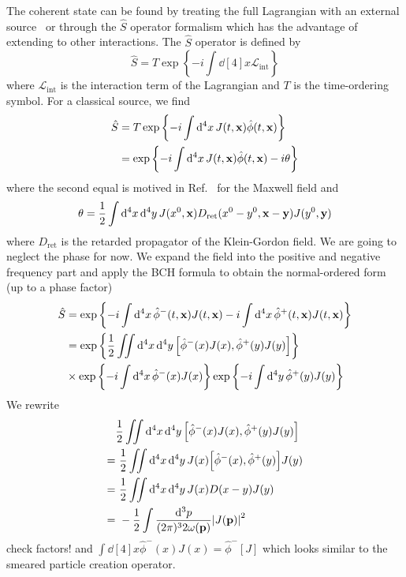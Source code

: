 The coherent state can be found by treating the full Lagrangian with an external source~\cite{Peskin1995} or through the $\hat{S}$ operator formalism which has the advantage of extending to other interactions.
The $\hat{S}$ operator is defined by
\begin{equation}
	\hat{S}
	=
	T\exp\left\{
		-i
		\int\dd[4]{x}
		\mathcal{L}_\text{int}
	\right\}
\end{equation}
where $\mathcal{L}_\text{int}$ is the interaction term of the Lagrangian and $T$ is the time-ordering symbol.
For a classical source, we find
\begin{equation}
	\begin{split}
		\hat{S}
		&=
		T\exp\left\{
			-i
			\int\dd[4]{x}
			J(t,\vb{x})
			\hat\phi(t,\vb{x})
		\right\}
		\\
		&=
		\exp\left\{
			-i
			\int\dd[4]{x}
			J(t,\vb{x})
			\hat\phi(t,\vb{x})
			-i\theta
		\right\}
	\end{split}
\end{equation}
where the second equal is motived in Ref.~\cite[p.~180]{Itzykson2012} for the Maxwell field and
\begin{equation}
	\theta
	=
	\frac{1}{2}
	\int\dd[4]{x}\dd[4]{y}
	J(x^0,\vb{x})
	D_\text{ret}(x^0-y^0,\vb{x}-\vb{y})
	J(y^0,\vb{y})
\end{equation}
where $D_\text{ret}$ is the retarded propagator of the Klein-Gordon field.
We are going to neglect the phase for now.
We expand the field into the positive and negative frequency part and apply the BCH formula to obtain the normal-ordered form (up to a phase factor)
\begin{equation}
	\begin{split}
		\hat{S}
		&=
		\exp\left\{
			-i
			\int\dd[4]{x}
			\hat\phi^-(t,\vb{x})
			J(t,\vb{x})
			-i
			\int\dd[4]{x}
			\hat\phi^+(t,\vb{x})
			J(t,\vb{x})
		\right\}
		\\
		&=
		\exp\left\{
			\frac{1}{2}
			\iint\dd[4]{x}\dd[4]{y}
			\comm{\hat\phi^-(x)J(x)}{\hat\phi^+(y)J(y)}
		\right\}
		\\
		&\times
		\exp\left\{
			-i
			\int\dd[4]{x}
			\hat\phi^-(x)
			J(x)
		\right\}
		\exp\left\{
			-i
			\int\dd[4]{y}
			\hat\phi^+(y)
			J(y)
		\right\}
	\end{split}
\end{equation}
We rewrite
\begin{equation}
	\begin{split}
		&
		\frac{1}{2}
		\iint\dd[4]{x}\dd[4]{y}
		\comm{\hat\phi^-(x)J(x)}{\hat\phi^+(y)J(y)}
		\\
		=&\
		\frac{1}{2}
		\iint\dd[4]{x}\dd[4]{y}
		J(x)
		\comm{\hat\phi^-(x)}{\hat\phi^+(y)}
		J(y)
		\\
		=&\
		\frac{1}{2}
		\iint\dd[4]{x}\dd[4]{y}
		J(x)
		D(x-y)
		J(y)
		\\
		=&\
		-
		\frac{1}{2}
		\int\frac{\dd[3]{p}}{(2\pi)^32\omega(\vb{p})}
		\abs{J(\vb{p})}^2
	\end{split}
\end{equation}
check factors!
and $\int\dd[4]{x}\hat\phi^-(x)J(x)=\hat\phi^-[J]$ which looks similar to the smeared particle creation operator.

